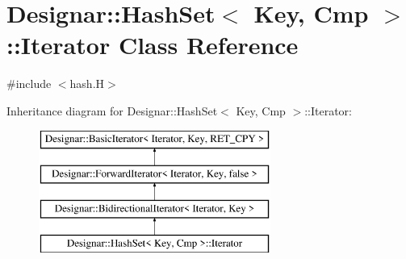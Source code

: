 \hypertarget{class_designar_1_1_hash_set_1_1_iterator}{}\section{Designar\+:\+:Hash\+Set$<$ Key, Cmp $>$\+:\+:Iterator Class Reference}
\label{class_designar_1_1_hash_set_1_1_iterator}


{\ttfamily \#include $<$hash.\+H$>$}

Inheritance diagram for Designar\+:\+:Hash\+Set$<$ Key, Cmp $>$\+:\+:Iterator\+:\begin{figure}[H]
\begin{center}
\leavevmode
\includegraphics[height=4.000000cm]{class_designar_1_1_hash_set_1_1_iterator}
\end{center}
\end{figure}
